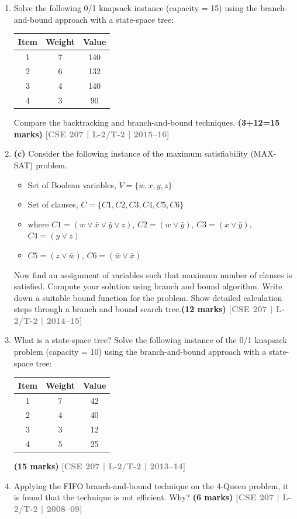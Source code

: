 \documentclass[12pt,a3paper]{article}
\newcommand{\yr}[1]{\hfill\textcolor{gray}{\small\textbf{[#1]}}}
\newcommand{\mk}[1]{\textcolor{orange!70!black}{\small\textbf{(#1 marks)}}}
\begin{document}
\begin{enumerate}
\item Solve the following 0/1 knapsack instance (capacity = 15) using the branch-and-bound approach with a state-space tree:
\begin{center}
\begin{tabular}{ccc}
\toprule
Item & Weight & Value \\
\midrule
1 & 7 & 140 \\
2 & 6 & 132 \\
3 & 4 & 140 \\
4 & 3 & 90 \\
\bottomrule
\end{tabular}
\end{center}
Compare the backtracking and branch-and-bound techniques. \mk{3+12=15}
\yr{CSE 207 | L-2/T-2 | 2015--16}

\item \textbf{(c)} Consider the following instance of the maximum satisfiability (MAX-SAT) problem.

\begin{itemize}
    \item[] Set of Boolean variables, $V = \{w, x, y, z\}$
    \item[] Set of clauses, $C = \{C1, C2, C3, C4, C5, C6\}$
    \item[] where $C1 = (w \vee \bar{x} \vee \bar{y} \vee z)$, \quad
            $C2 = (w \vee \bar{y})$, \quad
            $C3 = (x \vee \bar{y})$, \quad
            $C4 = (y \vee \bar{z})$
    \item[] $C5 = (z \vee \bar{w})$, \quad
            $C6 = (\bar{w} \vee \bar{x})$
\end{itemize}

\noindent
Now find an assignment of variables such that maximum number of clauses is satisfied.
Compute your solution using branch and bound algorithm. Write down a suitable bound
function for the problem. Show detailed calculation steps through a branch and bound
search tree.\mk{12}
\yr{CSE 207 | L-2/T-2 | 2014--15}

\item What is a state-space tree? Solve the following instance of the 0/1 knapsack problem (capacity = 10) using the branch-and-bound approach with a state-space tree:
\begin{center}
\begin{tabular}{ccc}
\toprule
Item & Weight & Value \\
\midrule
1 & 7 & 42 \\
2 & 4 & 40 \\
3 & 3 & 12 \\
4 & 5 & 25 \\
\bottomrule
\end{tabular}
\end{center}
\mk{15}
\yr{CSE 207 | L-2/T-2 | 2013--14}


  \item Applying the FIFO branch-and-bound technique on the 4-Queen problem, it is found that the technique is not efficient. Why? \mk{6}
\yr{CSE 207 | L-2/T-2 | 2008--09}

\end{enumerate}
\end{document}
